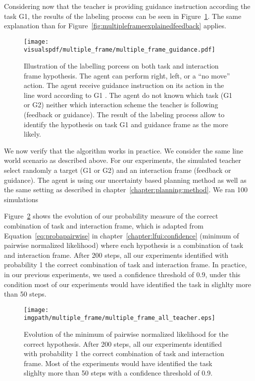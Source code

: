 Considering now that the teacher is providing guidance instruction according the task G1, the results of the labeling process can be seen in Figure~\ref{fig:multipleframeexplainedguidance}. The same explanation than for Figure~\ref{fig:multipleframeexplainedfeedback} applies. 

\begin{figure}[!ht]
\centering
\texttt{[image: \\visualspdf/multiple\_frame/multiple\_frame\_guidance.pdf]}
\caption{Illustration of the labelling porcess on both task and interaction frame hypothesis. The agent can perform right, left, or a ``no move'' action. The agent receive guidance instruction on its action in the line word according to G1 . The agent do not known which task (G1 or G2) neither which interaction scheme the teacher is following (feedback or guidance). The result of the labeling process allow to identify the hypothesis on task G1 and guidance frame as the more likely.}
\label{fig:multipleframeexplainedguidance}
\end{figure} 

We now verify that the algorithm works in practice. We consider the same line world scenario as described above. For our experiments, the simulated teacher select randomly a target (G1 or G2) and an interaction frame (feedback or guidance). The agent is using our uncertainty based planning method as well as the same setting as described in chapter~\ref{chapter:planning:method}. We ran 100 simulations


Figure~\ref{fig:multipleframeall} shows the evolution of our probability measure of the correct combination of task and interaction frame, which is adapted from Equation~\ref{eq:probapairwise} in chapter~\ref{chapter:lfui:confidence} (minimum of pairwise normalized likelihood) where each hypothesis is a combination of task and interaction frame. After 200 steps, all our experiments identified with probability 1 the correct combination of task and interaction frame. In practice, in our previous experiments, we used a confidence threshold of 0.9, under this condition most of our experiments would have identified the task in slighlty more than 50 steps.

\begin{figure}[!ht]
\centering
\texttt{[image: \\imgpath/multiple\_frame/multiple\_frame\_all\_teacher.eps]}
\caption{Evolution of the minimum of pairwise normalized likelihood for the correct hypothesis. After 200 steps, all our experiments identified with probability 1 the correct combination of task and interaction frame. Most of the experiments would have identified the task slighlty more than 50 steps with a confidence threshold of 0.9.}
\label{fig:multipleframeall}
\end{figure} 

